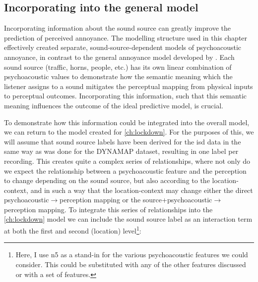 

\subsection{Incorporating into the general model}
Incorporating information about the sound source can greatly improve the prediction of perceived annoyance. The modelling structure used in this chapter effectively created separate, sound-source-dependent models of psychoacoustic annoyance, in contrast to the general annoyance model developed by \citet{PsychoacousticsfactsmodelsZwicker}. Each sound source (traffic, horns, people, etc.) has its own linear combination of psychoacoustic values to demonstrate how the semantic meaning which the listener assigns to a sound mitigates the perceptual mapping from physical inputs to perceptual outcomes. Incorporating this information, such that this semantic meaning influences the outcome of the ideal predictive model, is crucial. 

To demonstrate how this information could be integrated into the overall model, we can return to the model created for \cref{ch:lockdown}. For the purposes of this, we will assume that sound source labels have been derived for the \gls{isd} data in the same way as was done for the DYNAMAP dataset, resulting in one label per recording. This creates quite a complex series of relationships, where not only do we expect the relationship between a psychoacoustic feature and the perception to change depending on the sound source, but also according to the location-context, and in such a way that the location-context may change either the direct psychoacoustic$\rightarrow$perception mapping or the source+psychoacoustic$\rightarrow$perception mapping. To integrate this series of relationships into the \cref{ch:lockdown} model we can include the sound source label as an interaction term at both the first and second (location) level\footnote{Here, I use \gls{n5} as a stand-in for the various psychoacoustic features we could consider. This could be substituted with any of the other features discussed or with a set of features.}:


